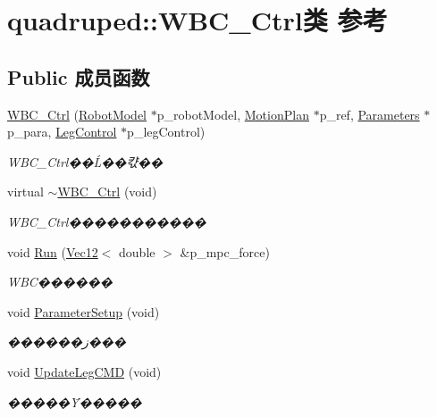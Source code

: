 \hypertarget{classquadruped_1_1WBC__Ctrl}{}\section{quadruped\+:\+:W\+B\+C\+\_\+\+Ctrl类 参考}
\label{classquadruped_1_1WBC__Ctrl}
\subsection*{Public 成员函数}
\begin{DoxyCompactItemize}
\item 
\hyperlink{classquadruped_1_1WBC__Ctrl_a32eb7d955bcce24ec6846d9542efc949}{W\+B\+C\+\_\+\+Ctrl} (\hyperlink{classquadruped_1_1RobotModel}{Robot\+Model} $\ast$p\+\_\+robot\+Model, \hyperlink{classquadruped_1_1MotionPlan}{Motion\+Plan} $\ast$p\+\_\+ref, \hyperlink{classquadruped_1_1Parameters}{Parameters} $\ast$p\+\_\+para, \hyperlink{classquadruped_1_1LegControl}{Leg\+Control} $\ast$p\+\_\+leg\+Control)
\begin{DoxyCompactList}\small\item\em W\+B\+C\+\_\+\+Ctrl��Ĺ��캯�� \end{DoxyCompactList}\item 
virtual \hyperlink{classquadruped_1_1WBC__Ctrl_a7bf29ff5650d0ef88ef61f5766edc425}{$\sim$\+W\+B\+C\+\_\+\+Ctrl} (void)
\begin{DoxyCompactList}\small\item\em W\+B\+C\+\_\+\+Ctrl����������� \end{DoxyCompactList}\item 
void \hyperlink{classquadruped_1_1WBC__Ctrl_ab27e13c54c86f5115e6807e18fd6d144}{Run} (\hyperlink{cppTypes_8h_a87f228860242acc66da2e58086d18cec}{Vec12}$<$ double $>$ \&p\+\_\+mpc\+\_\+force)
\begin{DoxyCompactList}\small\item\em W\+B\+C������ \end{DoxyCompactList}\item 
void \hyperlink{classquadruped_1_1WBC__Ctrl_a0e0f118c16781a623a77286d20b5ced0}{Parameter\+Setup} (void)
\begin{DoxyCompactList}\small\item\em ������ز��� \end{DoxyCompactList}\item 
void \hyperlink{classquadruped_1_1WBC__Ctrl_a2ec34349523dc12b29bf0a19ff5e6e53}{Update\+Leg\+C\+MD} (void)
\begin{DoxyCompactList}\small\item\em �����Ȳ����� \end{DoxyCompactList}\item 

\end{DoxyCompactItemize}
